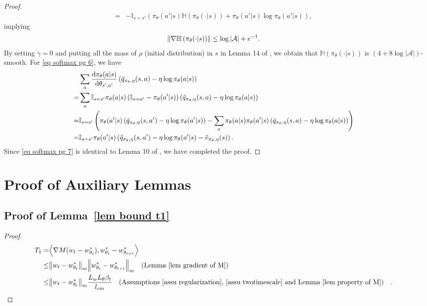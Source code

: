 \documentclass[twoside,11pt]{article}
\newcommand{\fA}{\mathcal{A}}
\newcommand{\na}{{|\fA|}}
\newcommand{\indot}[2]{{\left<#1, #2\right>}}
\newcommand{\ent}[1]{\mathbb{H}\left(#1\right)}
\numberwithin{assucounter}{section}
\begin{document}
\begin{proof}
\begin{align}
    =& -\mathbb{I}_{s=s'} \left(\pi_\theta(a'|s) \ent{\pi_\theta(\cdot | s)} + \pi_\theta(a'|s) \log \pi_\theta(a'|s) \right),
  \end{align}
  implying
  \begin{align}
    \norm{\nabla \ent{\pi_\theta(\cdot | s)}} \leq \log \na + e^{-1}.
  \end{align}
  By setting $\gamma = 0$ and putting all the mass of $\rho$ (initial distribution) in $s$ in Lemma 14 of \citet{mei2020global},
  we obtain that $\ent{\pi_\theta(\cdot |s)}$ is $(4+8\log \na)$-smooth.
  For \eqref{eq softmax pg 6}, we have
  \begin{align}
    &\sum_a \dv{\pi_\theta(a|s)}{\theta_{s',a'}} \left( \tilde q_{\pi_\theta, \eta}(s, a) - \eta \log \pi_\theta(a|s) \right)\\
    =& \sum_a \mathbb{I}_{s=s'} \pi_\theta(a|s) \left(\mathbb{I}_{a = a'} - \pi_\theta(a' | s)\right) \left( \tilde q_{\pi_\theta, \eta}(s, a) - \eta \log \pi_\theta(a|s) \right) \\
    =& \mathbb{I}_{s=s'} \left(\pi_\theta(a'|s) \left( \tilde q_{\pi_\theta, \eta}(s, a') - \eta \log \pi_\theta(a'|s) \right) -\sum_a \pi_\theta(a|s)  \pi_\theta(a' | s) \left( \tilde q_{\pi_\theta, \eta}(s, a) - \eta \log \pi_\theta(a|s) \right) \right) \\
    =& \mathbb{I}_{s=s'} \pi_\theta(a'|s) \left(\tilde q_{\pi_\theta, \eta}(s, a') - \eta \log \pi_{\theta}(a'|s) -  \tilde v_{\pi_\theta, \eta}(s) \right).
  \end{align}
  Since \eqref{eq softmax pg 7} is identical to Lemma 10 of \citet{mei2020global},
  we have completed the proof.
\end{proof}


\section{Proof of Auxiliary Lemmas}
\subsection{Proof of Lemma~\ref{lem bound t1}}
\label{sec proof lem bound t1}
\lemboundtone*
\begin{proof}
  \begin{align}
      T_1 =&\indot{\nabla M(w_t - w^*_{\theta_t})}{w^*_{\theta_t} - w^*_{\theta_{t+1}}} \\
      \leq & \norm{w_t - w^*_{\theta_t}}_m \norm{w^*_{\theta_t} - w^*_{\theta_{t+1}}}_m  \qq{(Lemma \ref{lem gradient of M})}\\
      \leq & \norm{w_t - w^*_{\theta_t}}_m \frac{L_w L_\theta \beta_t}{l_{cm}} \qq{(Assumptions \ref{assu regularization}, \ref{assu twotimescale} and Lemma \ref{lem property of M})}.
  \end{align}
\end{proof}
\end{document}
